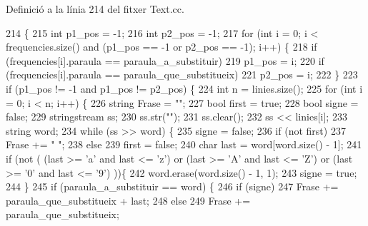 Definició a la línia 214 del fitxer Text.\+cc.


\begin{DoxyCode}
214                                                                                  \{
215     \textcolor{keywordtype}{int} p1\_pos = -1;
216     \textcolor{keywordtype}{int} p2\_pos = -1;
217     \textcolor{keywordflow}{for} (\textcolor{keywordtype}{int} i = 0; i < frequencies.size() and (p1\_pos == -1 or p2\_pos == -1); i++) \{
218         \textcolor{keywordflow}{if} (frequencies[i].paraula == paraula\_a\_substituir)
219             p1\_pos = i;
220         \textcolor{keywordflow}{if} (frequencies[i].paraula == paraula\_que\_substitueix)
221             p2\_pos = i;
222     \}
223     \textcolor{keywordflow}{if} (p1\_pos != -1 and p1\_pos != p2\_pos) \{
224         \textcolor{keywordtype}{int} n = linies.size();
225         \textcolor{keywordflow}{for} (\textcolor{keywordtype}{int} i = 0; i < n; i++) \{
226             \textcolor{keywordtype}{string} Frase = \textcolor{stringliteral}{""};
227             \textcolor{keywordtype}{bool} first = \textcolor{keyword}{true};
228             \textcolor{keywordtype}{bool} signe = \textcolor{keyword}{false};
229             stringstream ss;
230             ss.str(\textcolor{stringliteral}{""});
231             ss.clear();
232             ss << linies[i];
233             \textcolor{keywordtype}{string} word;
234             \textcolor{keywordflow}{while} (ss >> word) \{
235                 signe = \textcolor{keyword}{false};
236                 \textcolor{keywordflow}{if} (not first)
237                     Frase += \textcolor{stringliteral}{" "};
238                 \textcolor{keywordflow}{else}
239                     first = \textcolor{keyword}{false};
240                 \textcolor{keywordtype}{char} last = word[word.size() - 1];
241                 \textcolor{keywordflow}{if} (not ( (last >= \textcolor{charliteral}{'a'} and last <= \textcolor{charliteral}{'z'}) or (last >= \textcolor{charliteral}{'A'} and last <= \textcolor{charliteral}{'Z'}) or (last >= \textcolor{charliteral}{'0'} 
      and last <= \textcolor{charliteral}{'9'}) ))\{
242                     word.erase(word.size() - 1, 1);
243                     signe = \textcolor{keyword}{true};
244                 \}
245                 \textcolor{keywordflow}{if} (paraula\_a\_substituir == word) \{
246                     \textcolor{keywordflow}{if} (signe)
247                         Frase += paraula\_que\_substitueix + last;
248                     \textcolor{keywordflow}{else}
249                         Frase += paraula\_que\_substitueix;

\end{DoxyCode}
